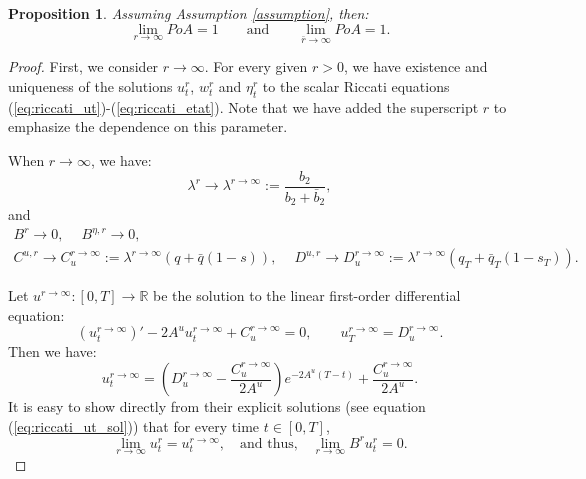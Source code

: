\documentclass[11pt]{article}
\newtheorem{proposition}{Proposition}
\begin{document}
\begin{proposition}
	Assuming Assumption \ref{assumption}, then:
	\begin{equation*}
			\lim_{r \to \infty} PoA = 1 \qquad \text{and} \qquad
			\lim_{\bar{r} \to \infty} PoA = 1.
	\end{equation*}
	\label{prop:r_bar_r}
\end{proposition}
\begin{proof}
	First, we consider $r \to \infty$. For every given $r >0$, we have existence and uniqueness of the solutions $u^{r}_t$, $w^{r}_t$ and $\eta^{r}_t$ to the scalar Riccati equations (\ref{eq:riccati_ut})-(\ref{eq:riccati_etat}). Note that we have added the superscript $r$ to emphasize the dependence on this parameter. 
	
	When $r \to \infty$, we have:
	\begin{equation*}
		\lambda^r \longrightarrow \lambda^{r\to\infty} := \frac{b_2}{b_2 + \bar{b}_2},
	\end{equation*}
	and
	\begin{equation*}
	\begin{array}{l}
		B^r \longrightarrow 0,\quad \ B^{\eta,r} \longrightarrow 0,\\
		C^{u,r} \longrightarrow C_u^{r\to \infty} := \lambda^{r \to \infty}(q + \bar{q}(1-s)),\quad \ D^{u,r} \to D_u^{r \to \infty} := \lambda^{r \to \infty}(q_T+ \bar{q}_T(1-s_T)).
	\end{array}
	\end{equation*}

	Let $u^{r \to \infty}:[0,T] \to \mathbb{R}$ be the solution to the linear first-order differential equation:
	\begin{equation*}
		\left({u}^{r \to \infty}_t\right)' - 2A^u u_t^{r \to \infty} + C^{r \to \infty}_u = 0, \qquad u_T^{r \to \infty} = D^{r \to \infty}_u.
	\end{equation*}
	Then we have:
	\begin{equation*}
	u_t^{r \to \infty} = \left(D^{r \to \infty}_u - \frac{C^{r \to \infty}_u}{2A^u} \right) e^{-2A^u (T-t)} +  \frac{C^{r \to \infty}_u}{2A^u}.
	\end{equation*}
	It is easy to show directly from their explicit solutions (see equation (\ref{eq:riccati_ut_sol})) that for every time $t\in [0,T]$, $$\lim_{r \to \infty}u^r_t=u^{r \to \infty}_t, \quad \text{and thus,} \quad \lim_{r \to \infty}B^ru^r_t=0.$$
	

\end{proof}
\end{document}
